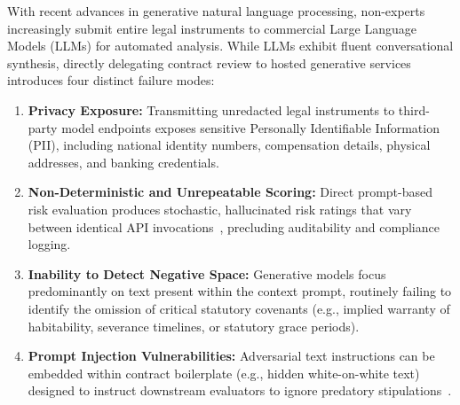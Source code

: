 \documentclass[conference]{IEEEtran}
\begin{document}
With recent advances in generative natural language processing, non-experts increasingly submit entire legal instruments to commercial Large Language Models (LLMs) for automated analysis. While LLMs exhibit fluent conversational synthesis, directly delegating contract review to hosted generative services introduces four distinct failure modes:
\begin{enumerate}
    \item \textbf{Privacy Exposure:} Transmitting unredacted legal instruments to third-party model endpoints exposes sensitive Personally Identifiable Information (PII), including national identity numbers, compensation details, physical addresses, and banking credentials.
    \item \textbf{Non-Deterministic and Unrepeatable Scoring:} Direct prompt-based risk evaluation produces stochastic, hallucinated risk ratings that vary between identical API invocations~\cite{dahl2024hallucination}, precluding auditability and compliance logging.
    \item \textbf{Inability to Detect Negative Space:} Generative models focus predominantly on text present within the context prompt, routinely failing to identify the omission of critical statutory covenants (e.g., implied warranty of habitability, severance timelines, or statutory grace periods).
    \item \textbf{Prompt Injection Vulnerabilities:} Adversarial text instructions can be embedded within contract boilerplate (e.g., hidden white-on-white text) designed to instruct downstream evaluators to ignore predatory stipulations~\cite{greshake2023promptinjection}.
\end{enumerate}
\end{document}
